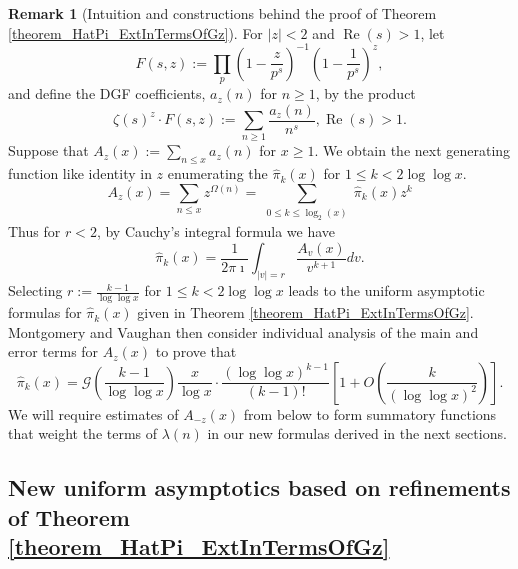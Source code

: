 \documentclass[11pt,reqno,a4letter]{article}
\numberwithin{figure}{section}
\numberwithin{table}{section}
\theoremstyle{plain}
\numberwithin{theorem}{section}
\theoremstyle{definition}
\newtheorem{remark}[theorem]{Remark}
\renewcommand{\Re}{\operatorname{Re}}
\begin{document}
\begin{remark}[Intuition and constructions behind the proof of Theorem \ref{theorem_HatPi_ExtInTermsOfGz}] 
\label{remark_intuitionConstrIn_theorem_HatPi_ExtInTermsOfGz} 
For $|z| < 2$ and $\Re(s) > 1$, let 
\begin{equation} 
\label{eqn_IntuitionMVThm_FszFuncDef_v1} 
F(s, z) := \prod_{p} \left(1 - \frac{z}{p^s}\right)^{-1} \left(1 - \frac{1}{p^s}\right)^{z}, 
\end{equation} 
and define the DGF coefficients, $a_z(n)$ for $n \geq 1$, by the product 
\[
\zeta(s)^{z} \cdot F(s, z) := \sum_{n \geq 1} \frac{a_z(n)}{n^s}, \Re(s) > 1. 
\]
Suppose that $A_z(x) := \sum_{n \leq x} a_z(n)$ for $x \geq 1$. We obtain the next 
generating function like identity in $z$ enumerating the $\widehat{\pi}_k(x)$ for 
$1 \leq k < 2 \log\log x$. 
\begin{equation} 
\label{eqn_remark_MV_AzxCoeffFormlaIntegral_v1} 
A_z(x) = \sum_{n \leq x} z^{\Omega(n)} = \sum_{\substack{0 \leq k \leq \log_2(x)}} \widehat{\pi}_k(x) z^k 
\end{equation} 
Thus for $r < 2$, by Cauchy's integral formula we have 
\[
\widehat{\pi}_k(x) = \frac{1}{2\pi\imath} \int_{|v|=r} \frac{A_v(x)}{v^{k+1}} dv. 
\]
Selecting $r := \frac{k-1}{\log\log x}$ for $1 \leq k < 2 \log\log x$ 
leads to the uniform asymptotic formulas for $\widehat{\pi}_k(x)$ given in 
Theorem \ref{theorem_HatPi_ExtInTermsOfGz}. 
Montgomery and Vaughan then consider individual analysis of the main and error 
terms for $A_z(x)$ to prove that 
\[
\widehat{\pi}_k(x) = \mathcal{G}\left(\frac{k-1}{\log\log x}\right) \frac{x}{\log x} \cdot 
     \frac{(\log\log x)^{k-1}}{(k-1)!} \left[1 + O\left(\frac{k}{(\log\log x)^2}\right)\right]. 
\]
We will require estimates of $A_{-z}(x)$ from below to form summatory functions 
that weight the terms of $\lambda(n)$ in our new formulas derived in the next sections. 
\end{remark} 

\subsection{New uniform asymptotics based on refinements of Theorem \ref{theorem_HatPi_ExtInTermsOfGz}} 
\label{subSection_PartialPrimeProducts_Proofs} 
\end{document}
